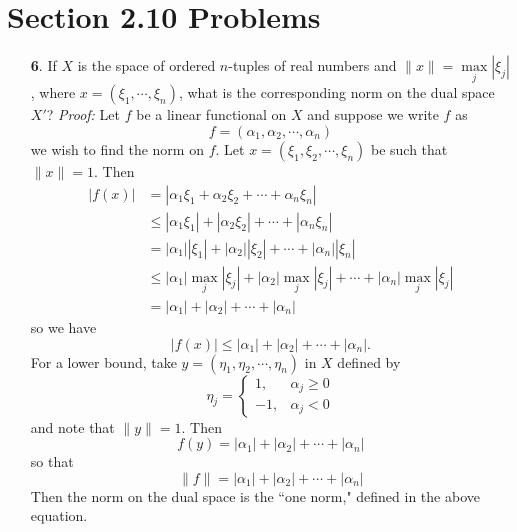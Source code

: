 \documentclass{article}
\begin{document}
\section*{Section 2.10 Problems}
\begin{itemize}
    \item[\textbf{6}.] If $X$ is the space of ordered $n$-tuples of real numbers and $\|x\| = \underset{j}{\max} |\xi_j|$, where $x = (\xi_1, \cdots, \xi_n)$, what is the corresponding norm on the dual space $X'$?
    \newline\newline
    \textit{Proof:} Let $f$ be a linear functional on $X$ and suppose we write $f$ as 
    \[f = (\alpha_1, \alpha_2, \cdots, \alpha_n)\]
    we wish to find the norm on $f$. Let $x = (\xi_1, \xi_2, \cdots, \xi_n)$ be such that $\|x\| = 1$. Then
    \begin{align*}
        |f(x)| &= |\alpha_1 \xi_1 + \alpha_2 \xi_2 + \cdots + \alpha_n \xi_n|\\
        &\leq |\alpha_1\xi_1| + |\alpha_2 \xi_2| + \cdots + |\alpha_n \xi_n|\\
        &= |\alpha_1||\xi_1| + |\alpha_2| |\xi_2| + \cdots + |\alpha_n| |\xi_n|\\
        &\leq |\alpha_1| \underset{j}{\max}|\xi_j| + |\alpha_2| \underset{j}{\max}|\xi_j| + \cdots + |\alpha_n| \underset{j}{\max}|\xi_j|\\
        &= |\alpha_1| + |\alpha_2| + \cdots + |\alpha_n|
    \end{align*}
    so we have
    \[|f(x)| \leq |\alpha_1| + |\alpha_2| + \cdots + |\alpha_n|.\]
    For a lower bound, take $y = (\eta_1, \eta_2, \cdots, \eta_n)$ in $X$ defined by
    \[\eta_j = \begin{cases}
        1, & \alpha_j \geq 0\\
        -1, & \alpha_j < 0
    \end{cases}\]
    and note that $\|y\| = 1$. Then 
    \[f(y) = |\alpha_1| + |\alpha_2| + \cdots + |\alpha_n|\]
    so that 
    \[\|f\| = |\alpha_1| + |\alpha_2| + \cdots + |\alpha_n|\]
    Then the norm on the dual space is the ``one norm," defined in the above equation.
    
\end{itemize}
\end{document}
